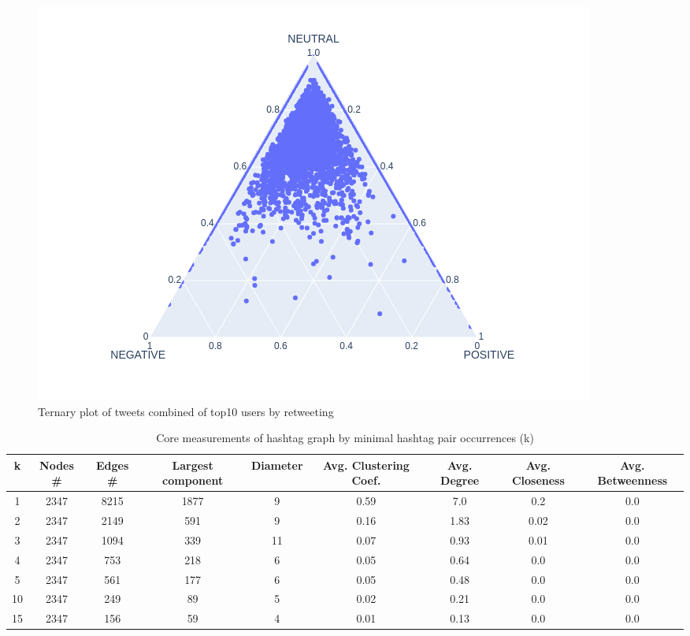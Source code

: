 \documentclass[conference]{IEEEtran}
\begin{document}
    \begin{figure}
        \includegraphics[scale=0.4]{figures/sentiment_ternary_all}
        \caption{Ternary plot of tweets combined of top10 users by retweeting }
        \label{fig:sentiment-ternary-user-retweet}
    \end{figure}


    \begin{table}[ht]
        \begin{tabular} { | c | c | c | c | c | c | c | c | c | }
            \hline
            k & Nodes \# & Edges \# & Largest component & Diameter & Avg. Clustering Coef. & Avg. Degree
            & Avg. Closeness
            & Avg. Betweenness
            \\
            \hline
            1  & 2347 & 8215 & 1877 & 9  & 0.59 & 7.0  & 0.2  & 0.0 \\
            \hline
            2  & 2347 & 2149 & 591  & 9  & 0.16 & 1.83 & 0.02 & 0.0 \\
            \hline
            3  & 2347 & 1094 & 339  & 11 & 0.07 & 0.93 & 0.01 & 0.0 \\
            \hline
            4  & 2347 & 753  & 218  & 6  & 0.05 & 0.64 & 0.0  & 0.0 \\
            \hline
            5  & 2347 & 561  & 177  & 6  & 0.05 & 0.48 & 0.0  & 0.0 \\
            \hline
            10 & 2347 & 249  & 89   & 5  & 0.02 & 0.21 & 0.0  & 0.0 \\
            \hline
            15 & 2347 & 156  & 59   & 4  & 0.01 & 0.13 & 0.0  & 0.0 \\
            \hline

        \end{tabular}
        \caption {Core measurements of hashtag graph by minimal hashtag pair occurrences (k)}
        \label {tab:graphstats-by-k}
    \end{table}
\end{document}
